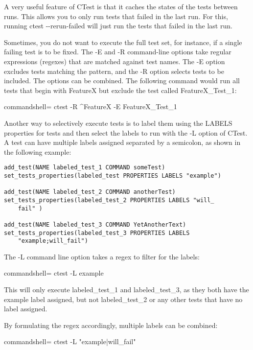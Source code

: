 A very useful feature of CTest is that it caches the states of the tests between runs. This allows you to only run tests that failed in the last run. For this, running ctest -{}-rerun-failed will just run the tests that failed in the last run.

Sometimes, you do not want to execute the full test set, for instance, if a single failing test is to be fixed. The -E and -R command-line options take regular expressions (regexes) that are matched against test names. The -E option excludes tests matching the pattern, and the -R option selects tests to be included. The options can be combined. The following command would run all tests that begin with FeatureX but exclude the test called FeatureX\_Test\_1:

\begin{tcblisting}{commandshell={}}
ctest -R ^FeatureX -E FeatureX_Test_1
\end{tcblisting}

Another way to selectively execute tests is to label them using the LABELS properties for tests and then select the labels to run with the -L option of CTest. A test can have multiple labels assigned separated by a semicolon, as shown in the following example:

\begin{lstlisting}[style=styleCMake]
add_test(NAME labeled_test_1 COMMAND someTest)
set_tests_properties(labeled_test PROPERTIES LABELS "example")

add_test(NAME labeled_test_2 COMMAND anotherTest)
set_tests_properties(labeled_test_2 PROPERTIES LABELS "will_
	fail" )

add_test(NAME labeled_test_3 COMMAND YetAnotherText)
set_tests_properties(labeled_test_3 PROPERTIES LABELS
	"example;will_fail")
\end{lstlisting}

The -L command line option takes a regex to filter for the labels:

\begin{tcblisting}{commandshell={}}
ctest -L example
\end{tcblisting}

This will only execute labeled\_test\_1 and labeled\_test\_3, as they both have the example label assigned, but not labeled\_test\_2 or any other tests that have no label assigned.

By formulating the regex accordingly, multiple labels can be combined:

\begin{tcblisting}{commandshell={}}
ctest -L "example|will_fail"
\end{tcblisting}

